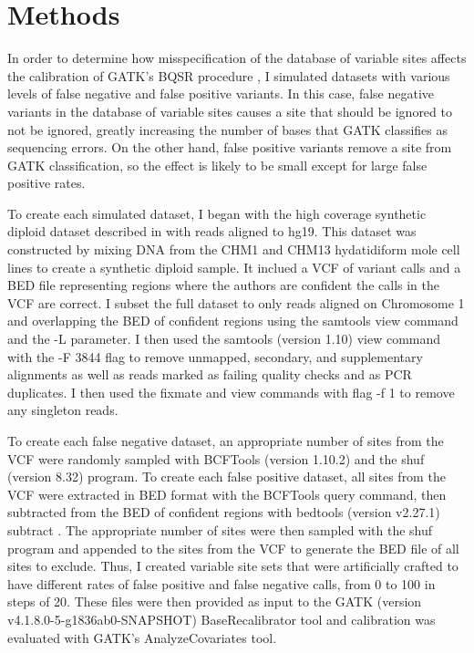 \section{Methods}

In order to determine how misspecification of the database of variable sites affects the calibration of GATK's BQSR procedure \parencite{auwera_fastq_2013}, I simulated datasets with various levels of false negative and false positive variants. In this case, false negative variants in the database of variable sites causes a site that should be ignored to not be ignored, greatly increasing the number of bases that GATK classifies as sequencing errors. On the other hand, false positive variants remove a site from GATK classification, so the effect is likely to be small except for large false positive rates.

To create each simulated dataset, I began with the high coverage synthetic diploid dataset described in \cite{li_synthetic-diploid_2018} with reads aligned to hg19. This dataset was constructed by mixing DNA from the CHM1 and CHM13 hydatidiform mole cell lines to create a synthetic diploid sample. It inclued a VCF of variant calls and a BED file representing regions where the authors are confident the calls in the VCF are correct. I subset the full dataset to only reads aligned on Chromosome 1 and overlapping the BED of confident regions using the samtools view command \parencite{li_sequence_2009} and the -L parameter. I then used the samtools (version 1.10) view command with the -F 3844 flag to remove unmapped, secondary, and supplementary alignments as well as reads marked as failing quality checks and as PCR duplicates. I then used the fixmate and view commands with flag -f 1 to remove any singleton reads.

To create each false negative dataset, an appropriate number of sites from the VCF were randomly sampled with BCFTools (version 1.10.2) and the shuf (version 8.32) program. To create each false positive dataset, all sites from the VCF were extracted in BED format with the BCFTools query command, then subtracted from the BED of confident regions with bedtools (version v2.27.1) subtract \parencite{quinlan_bedtools_2010}. The appropriate number of sites were then sampled with the shuf program and appended to the sites from the VCF to generate the BED file of all sites to exclude. Thus, I created variable site sets that were artificially crafted to have different rates of false positive and false negative calls, from 0 to 100 in steps of 20.
These files were then provided as input to the GATK (version v4.1.8.0-5-g1836ab0-SNAPSHOT) BaseRecalibrator tool and calibration was evaluated with GATK's AnalyzeCovariates tool.


